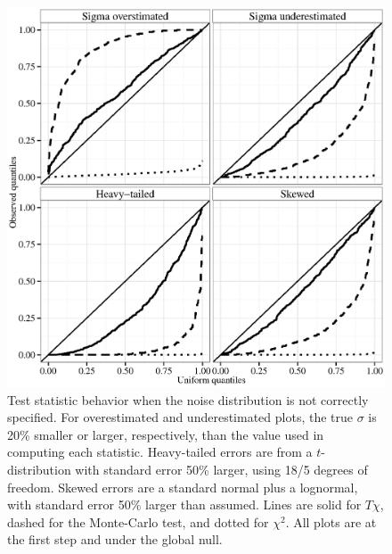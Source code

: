 \documentclass[oupdraft]{bio}
\begin{document}
\begin{figure}
\begin{center}
\includegraphics[width=.9\textwidth]{global_null_G200.eps}
\caption{Test statistic behavior when the noise distribution is not correctly specified. For overestimated and underestimated plots, the true $\sigma$ is 20\% smaller or larger, respectively, than the value used in computing each statistic. Heavy-tailed errors are from a $t$-distribution with standard error 50\% larger, using 18/5 degrees of freedom. Skewed errors are a standard normal plus a lognormal, with standard error 50\% larger than assumed. Lines are solid for $T\chi$, dashed for the Monte-Carlo test, and dotted for $\chi^2$. All plots are at the first step and under the global null.}
\label{fig:noisedist}
\end{center}
\end{figure}
\end{document}
